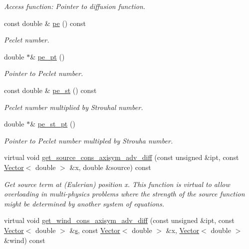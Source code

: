 \begin{DoxyCompactItemize}
\begin{DoxyCompactList}\small\item\em Access function\+: Pointer to diffusion function. \end{DoxyCompactList}\item 
const double \& \hyperlink{namespaceoomph_afc45e5b8613b10bb546b3400a996d8a2}{pe} () const
\begin{DoxyCompactList}\small\item\em Peclet number. \end{DoxyCompactList}\item 
double $\ast$\& \hyperlink{namespaceoomph_a92163fa29e433b796a345137e525b3af}{pe\+\_\+pt} ()
\begin{DoxyCompactList}\small\item\em Pointer to Peclet number. \end{DoxyCompactList}\item 
const double \& \hyperlink{namespaceoomph_a7f4533f76fda86b1fe191b46ae452971}{pe\+\_\+st} () const
\begin{DoxyCompactList}\small\item\em Peclet number multiplied by Strouhal number. \end{DoxyCompactList}\item 
double $\ast$\& \hyperlink{namespaceoomph_a996fd022407db74d470a6989afe05add}{pe\+\_\+st\+\_\+pt} ()
\begin{DoxyCompactList}\small\item\em Pointer to Peclet number multipled by Strouha number. \end{DoxyCompactList}\item 
virtual void \hyperlink{namespaceoomph_aa0cdf7be6b3844c558f937572c4dfb5c}{get\+\_\+source\+\_\+cons\+\_\+axisym\+\_\+adv\+\_\+diff} (const unsigned \&ipt, const \hyperlink{classoomph_1_1Vector}{Vector}$<$ double $>$ \&x, double \&source) const
\begin{DoxyCompactList}\small\item\em Get source term at (Eulerian) position x. This function is virtual to allow overloading in multi-\/physics problems where the strength of the source function might be determined by another system of equations. \end{DoxyCompactList}\item 
virtual void \hyperlink{namespaceoomph_aa6e74f36ccca7009265f81f333c4b5df}{get\+\_\+wind\+\_\+cons\+\_\+axisym\+\_\+adv\+\_\+diff} (const unsigned \&ipt, const \hyperlink{classoomph_1_1Vector}{Vector}$<$ double $>$ \&\hyperlink{cfortran_8h_ab7123126e4885ef647dd9c6e3807a21c}{s}, const \hyperlink{classoomph_1_1Vector}{Vector}$<$ double $>$ \&x, \hyperlink{classoomph_1_1Vector}{Vector}$<$ double $>$ \&wind) const

\end{DoxyCompactItemize}
